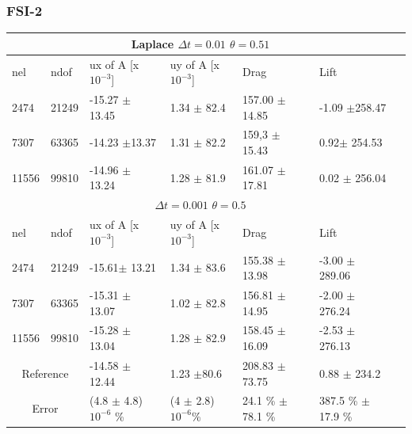 \newpage
\subsubsection{FSI-2}

\begin{table}[h!]
\centering
\label{my-label}
\begin{tabular}{ |p{1cm}||p{1cm}|p{3.2cm}|p{3.2cm}|p{2.9cm}|p{3.1cm}|p{1.2cm}|}
 \hline
  \multicolumn{6}{|c|}{Laplace \hspace{2mm} $\Delta t = 0.01$  \hspace{2mm}  $\theta = 0.51$} \\
   \hline
nel & ndof & ux of A [x $10^{-3}$]  &uy of A [x $10^{-3}$]& Drag  & Lift \\
 \hline
 2474    & 21249  & -15.27  $\pm$ 13.45 & 1.34  $\pm$  82.4 & 157.00  $\pm$14.85 & -1.09  $\pm$258.47 \\
 7307    & 63365  &   -14.23  $\pm$13.37 & 1.31   $\pm$ 82.2 & 159,3 $\pm$ 15.43 & 0.92$\pm$ 254.53  \\
 11556   & 99810  & -14.96 $\pm$ 13.24 & 1.28  $\pm$ 81.9 & 161.07 $\pm$  17.81 & 0.02  $\pm$ 256.04  \\
 \hline
  \multicolumn{6}{|c|}{$\Delta t = 0.001$  \hspace{2mm}  $\theta = 0.5$} \\
   \hline
 nel & ndof & ux of A [x $10^{-3}$]  &uy of A [x $10^{-3}$]& Drag  & Lift \\
    \hline
 2474    & 21249  & -15.61$\pm$  13.21 & 1.34  $\pm$ 83.6 & 155.38   $\pm$   13.98 & -3.00  $\pm$   289.06 \\
 7307    & 63365  & -15.31  $\pm$ 13.07 & 1.02    $\pm$  82.8 & 156.81  $\pm$  14.95 & -2.00   $\pm$   276.24 \\
 11556   & 99810  & -15.28   $\pm$  13.04 & 1.28 $\pm$ 82.9 & 158.45  $\pm$  16.09 & -2.53   $\pm$  276.13 \\
 \hline
  \multicolumn{2}{|c|}{Reference} & -14.58 $\pm$ 12.44   & 1.23 $\pm$80.6    & 208.83 $\pm$ 73.75 & 0.88 $\pm$ 234.2 \\
   \hline
    \multicolumn{2}{|c|}{Error}  & (4.8 $\pm$  4.8)$10^{-6}$ \% &  (4 $\pm$ 2.8) $10^{-6}$\% & 24.1 \% $\pm$ 78.1 \% & 387.5 \% $\pm$ 17.9 \%   \\
   \hline
\end{tabular}
\end{table}

